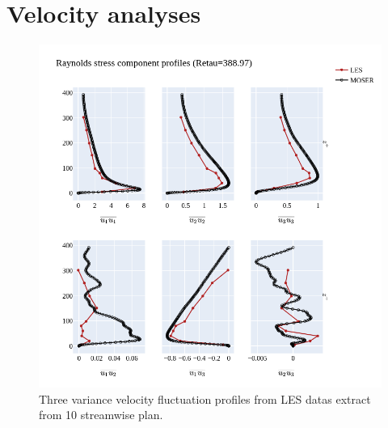 \documentclass[]{article}
\theoremstyle{plain}
\theoremstyle{remark}
\begin{document}
\section{Velocity analyses}


\begin{figure}[H]
	\begin{center}
		\includegraphics[width=\textwidth]{../../output/figures/channel_wrles_retau395/split_time/RANS/var_velocity_profiles_all.png}
		\caption{Three variance velocity fluctuation profiles from LES datas extract from 10 streamwise plan.}
	\end{center}
\end{figure}
\end{document}

